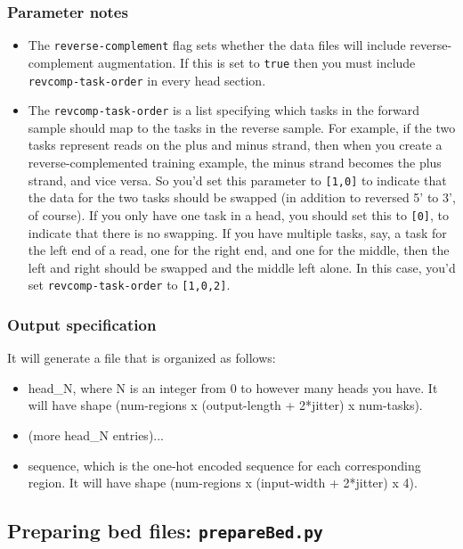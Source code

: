 \documentclass{article}
\begin{document}
\subsubsection{Parameter notes}
\begin{itemize}
    \item The \texttt{reverse-complement} flag sets whether the data files will include reverse-complement augmentation. If this is set to \texttt{true} then you must include \texttt{revcomp-task-order} in every head section.
    \item The \texttt{revcomp-task-order} is a list specifying which tasks in the forward sample should map to the tasks in the reverse sample. For example, if the two tasks represent reads on the plus and minus strand, then when you create a reverse-complemented training example, the minus strand becomes the plus strand, and vice versa. So you'd set this parameter to \texttt{[1,0]} to indicate that the data for the two tasks should be swapped (in addition to reversed 5' to 3', of course). If you only have one task in a head, you should set this to \texttt{[0]}, to indicate that there is no swapping. If you have multiple tasks, say, a task for the left end of a read, one for the right end, and one for the middle, then the left and right should be swapped and the middle left alone. In this case, you'd set \texttt{revcomp-task-order} to \texttt{[1,0,2]}. 
\end{itemize}

\subsubsection{Output specification}

It will generate a file that is organized as follows:

\begin{itemize}
    \item head\_N, where N is an integer from 0 to however many heads you have. It will have shape (num-regions x (output-length + 2*jitter) x num-tasks). 
    \item (more head\_N entries)...
    \item sequence, which is the one-hot encoded sequence for each corresponding region. It will have shape (num-regions x (input-width + 2*jitter) x 4). 
\end{itemize}




\newpage

\subsection{Preparing bed files: \texttt{prepareBed.py}}
\end{document}
